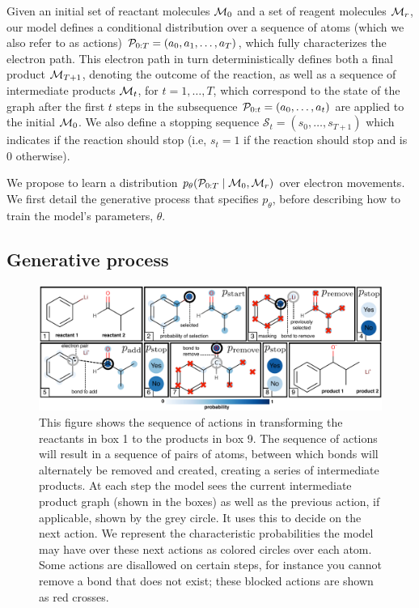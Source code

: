 Given an initial set of reactant molecules ${\mathcal{M}}_0$ and a set of reagent molecules ${\mathcal{M}}_r$, 
our model defines a conditional distribution over a sequence of atoms (which we also refer to as actions) ${\mathcal{P}}_{0:T} = (a_0, a_1, \ldots, a_T)$,
which fully characterizes the electron path.
This electron path in turn deterministically defines both a final product ${\mathcal{M}}_{T+1}$, 
denoting the outcome of the reaction,
as well as a sequence of intermediate products ${\mathcal{M}}_t$, for $t = 1,\dots,T$,
which correspond to the state of the graph after the first $t$ steps in the subsequence ${\mathcal{P}}_{0:t} = (a_0, \dots, a_t)$ are applied to the initial ${\mathcal{M}}_0$. We also define a stopping sequence $\mathcal{S}_t = (s_0, \ldots, s_{T+1})$ which indicates if the reaction should stop (i.e, $s_t\!=\!1$ if the reaction should stop and is $0$ otherwise). 

We propose to learn a distribution $p_\theta( {\mathcal{P}}_{0:T} \mid {\mathcal{M}}_0, {\mathcal{M}}_r)$ over electron movements. 
We first detail the generative process %
that specifies $p_\theta$, before describing how to train the model's parameters, $\theta$.


\subsection{Generative process}


\begin{figure}
\centering
\includegraphics[width=\textwidth]{reaction_model_blue}
\caption{
 This figure shows the sequence of actions in transforming the reactants in box 1 to the products in box 9.
 The sequence of actions will result in a sequence of pairs of atoms, between which bonds will alternately be removed and created, creating a series of intermediate products. 
At each step the model sees the current intermediate product graph (shown in the boxes) as well as the previous action, if applicable, shown by the grey circle. It uses this to decide on the next action.
We represent the characteristic probabilities the model may have over these next actions as colored circles over each atom.
Some actions are disallowed on certain steps, for instance you cannot remove a bond that does not exist; these blocked actions are shown as red crosses.
}
\label{fig:reaction_model}
\end{figure}







